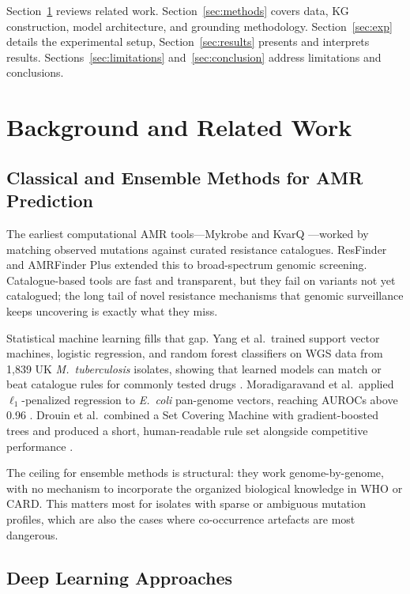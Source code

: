 \documentclass[conference]{IEEEtran}
\begin{document}
{Section~\ref{sec:related} reviews related work. Section~\ref{sec:methods} covers data, KG construction, model architecture, and grounding methodology. Section~\ref{sec:exp} details the experimental setup, Section~\ref{sec:results} presents and interprets results. Sections~\ref{sec:limitations} and~\ref{sec:conclusion} address limitations and conclusions.}

\section{Background and Related Work}\label{sec:related}

\subsection{Classical and Ensemble Methods for AMR Prediction}

The earliest computational AMR tools---Mykrobe \cite{mykrobe} and KvarQ \cite{kvarq}---worked by matching observed mutations against curated resistance catalogues. ResFinder \cite{resfinder4} and AMRFinder Plus \cite{amrfinderplus} extended this to broad-spectrum genomic screening. Catalogue-based tools are fast and transparent, but they fail on variants not yet catalogued; the long tail of novel resistance mechanisms that genomic surveillance keeps uncovering is exactly what they miss.

Statistical machine learning fills that gap. Yang et al.\ trained support vector machines, logistic regression, and random forest classifiers on WGS data from 1,839 UK \textit{M.~tuberculosis} isolates, showing that learned models can match or beat catalogue rules for commonly tested drugs \cite{linear_amr}. Moradigaravand et al.\ applied $\ell_1$-penalized regression to \textit{E.~coli} pan-genome vectors, reaching AUROCs above 0.96 \cite{moradigaravand2018}. Drouin et al.\ combined a Set Covering Machine with gradient-boosted trees and produced a short, human-readable rule set alongside competitive performance \cite{xgb_amr}.

The ceiling for ensemble methods is structural: they work genome-by-genome, with no mechanism to incorporate the organized biological knowledge in WHO or CARD. This matters most for isolates with sparse or ambiguous mutation profiles, which are also the cases where co-occurrence artefacts are most dangerous.

\subsection{Deep Learning Approaches}
\end{document}
